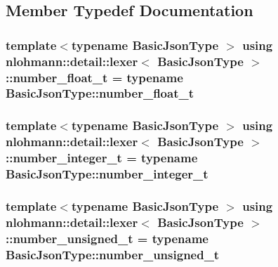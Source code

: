 \subsection{Member Typedef Documentation}
\subsubsection[{\texorpdfstring{number\+\_\+float\+\_\+t}{number_float_t}}]{\setlength{\rightskip}{0pt plus 5cm}template$<$typename Basic\+Json\+Type $>$ using {\bf nlohmann\+::detail\+::lexer}$<$ Basic\+Json\+Type $>$\+::{\bf number\+\_\+float\+\_\+t} =  typename Basic\+Json\+Type\+::number\+\_\+float\+\_\+t\hspace{0.3cm}{\ttfamily [private]}}\hypertarget{classnlohmann_1_1detail_1_1lexer_aa7f9e7b2bcd311fb86e2da43761a6619}{}\label{classnlohmann_1_1detail_1_1lexer_aa7f9e7b2bcd311fb86e2da43761a6619}
\subsubsection[{\texorpdfstring{number\+\_\+integer\+\_\+t}{number_integer_t}}]{\setlength{\rightskip}{0pt plus 5cm}template$<$typename Basic\+Json\+Type $>$ using {\bf nlohmann\+::detail\+::lexer}$<$ Basic\+Json\+Type $>$\+::{\bf number\+\_\+integer\+\_\+t} =  typename Basic\+Json\+Type\+::number\+\_\+integer\+\_\+t\hspace{0.3cm}{\ttfamily [private]}}\hypertarget{classnlohmann_1_1detail_1_1lexer_a9cd1b11cc67edbfb2613c788b5bd337c}{}\label{classnlohmann_1_1detail_1_1lexer_a9cd1b11cc67edbfb2613c788b5bd337c}
\subsubsection[{\texorpdfstring{number\+\_\+unsigned\+\_\+t}{number_unsigned_t}}]{\setlength{\rightskip}{0pt plus 5cm}template$<$typename Basic\+Json\+Type $>$ using {\bf nlohmann\+::detail\+::lexer}$<$ Basic\+Json\+Type $>$\+::{\bf number\+\_\+unsigned\+\_\+t} =  typename Basic\+Json\+Type\+::number\+\_\+unsigned\+\_\+t\hspace{0.3cm}{\ttfamily [private]}}\hypertarget{classnlohmann_1_1detail_1_1lexer_a105d1dfeab414a572655895cdd96a52a}{}\label{classnlohmann_1_1detail_1_1lexer_a105d1dfeab414a572655895cdd96a52a}
